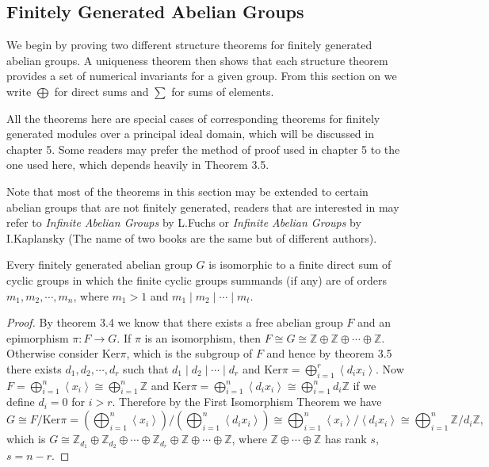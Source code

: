 \subsection{Finitely Generated Abelian Groups}
We begin by proving two different structure theorems for finitely generated abelian groups. A uniqueness theorem then shows that each structure theorem provides a set of numerical invariants for a given group. From this section on we write $\bigoplus$ for direct sums and $\sum$ for sums of elements.\par
All the theorems here are special cases of corresponding theorems for finitely generated modules over a principal ideal domain, which will be discussed in chapter 5. Some readers may prefer the method of proof used in chapter 5 to the one used here, which depends heavily in Theorem 3.5.\par
Note that most of the theorems in this section may be extended to certain abelian groups that are not finitely generated, readers that are interested in may refer to \textit{Infinite Abelian Groups} by L.Fuchs or \textit{Infinite Abelian Groups} by I.Kaplansky (The name of two books are the same but of different authors).
\begin{theorem}
Every finitely generated abelian group $G$ is isomorphic to a finite direct sum of cyclic groups in which the finite cyclic groups summands (if any) are of orders $m_1,m_2,\cdots,m_n$, where $m_1>1$ and $m_1\mid m_2\mid\cdots\mid m_t$.
\end{theorem}
\begin{proof}
By theorem 3.4 we know that there exists a free abelian group $F$ and an epimorphism $\pi:F\to G$. If $\pi$ is an isomorphism, then $F\cong G\cong\mathbb{Z}\oplus\mathbb{Z}\oplus\cdots\oplus\mathbb{Z}$. Otherwise consider $\mathrm{Ker}\pi$, which is the subgroup of $F$ and hence by theorem 3.5 there exists $d_1,d_2,\cdots,d_r$ such that $d_1\mid d_2\mid\cdots\mid d_r$ and $\mathrm{Ker}\pi=\bigoplus_{i=1}^r\left<d_ix_i\right>$. Now $F=\bigoplus_{i=1}^n\left<x_i\right>\cong\bigoplus_{i=1}^n\mathbb{Z}$ and $\mathrm{Ker}\pi=\bigoplus_{i=1}^n\left<d_ix_i\right>\cong\bigoplus_{i=1}^nd_i\mathbb{Z}$ if we define $d_i=0$ for $i>r$. Therefore by the First Isomorphism Theorem we have 
$$
G\cong F/\mathrm{Ker}\pi =\left( \bigoplus_{i=1}^n{\left< x_i \right>} \right) {/}\left( \bigoplus_{i=1}^n{\left< d_ix_i \right>} \right) \cong \bigoplus_{i=1}^n{\left< x_i \right> /\left< d_ix_i \right>}\cong \bigoplus_{i=1}^n{\mathbb{Z} /d_i\mathbb{Z}},
$$
which is $G\cong\mathbb{Z}_{d_1}\oplus\mathbb{Z}_{d_2}\oplus\cdots\oplus\mathbb{Z}_{d_r}\oplus\mathbb{Z}\oplus\cdots\oplus\mathbb{Z}$, where $\mathbb{Z}\oplus\cdots\oplus\mathbb{Z}$ has rank $s$, $s=n-r$.
\end{proof}
